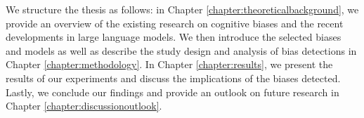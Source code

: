 \par We structure the thesis as follows: in Chapter \ref{chapter:theoreticalbackground}, we provide an overview of the existing research on cognitive biases and the recent developments in large language models. We then introduce the selected biases and models as well as describe the study design and analysis of bias detections in Chapter \ref{chapter:methodology}. In Chapter \ref{chapter:results}, we present the results of our experiments and discuss the implications of the biases detected. Lastly, we conclude our findings and provide an outlook on future research in Chapter \ref{chapter:discussionoutlook}.